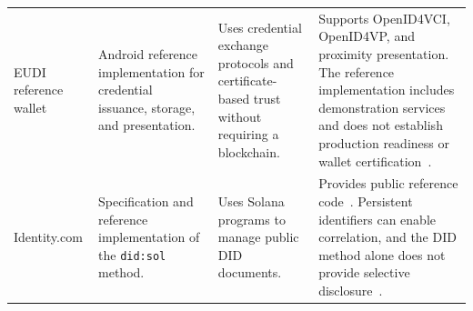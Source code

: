 \begin{table}[htbp]
\begin{tabular}{>{\raggedright\arraybackslash}m{}>{\raggedright\arraybackslash}m{}>{\raggedright\arraybackslash}m{}>{\raggedright\arraybackslash}m{}}
\addlinespace[5pt]

EUDI reference wallet &
Android reference implementation for credential issuance, storage, and presentation. &
Uses credential exchange protocols and certificate-based trust without requiring a blockchain. &
Supports OpenID4VCI, OpenID4VP, and proximity presentation. The reference implementation includes demonstration services and does not establish production readiness or wallet certification~\cite{platform-eudi-wallet}. \\

\addlinespace[5pt]

Identity.com &
Specification and reference implementation of the \texttt{did:sol} method. &
Uses Solana programs to manage public DID documents. &
Provides public reference code~\cite{platform-sol-did}. Persistent identifiers can enable correlation, and the DID method alone does not provide selective disclosure~\cite{platform-sol-did}. \\

\bottomrule
\end{tabular}
\end{table}
